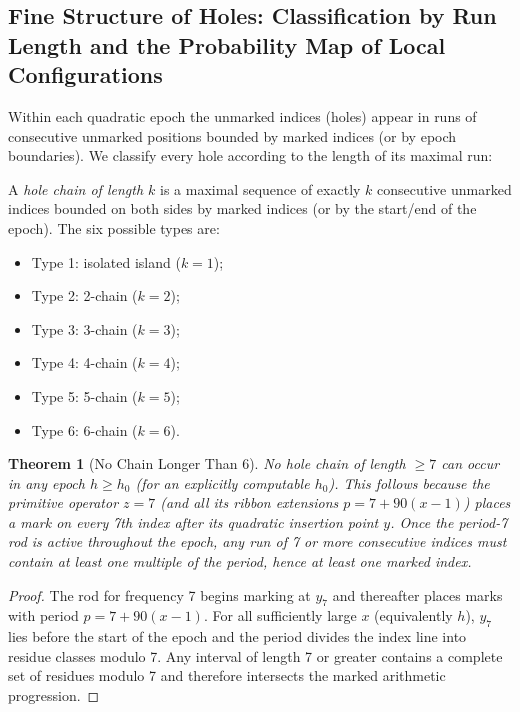 \documentclass[11pt,a4paper]{article}
\newtheorem{theorem}{Theorem} %
\begin{document}
\subsection{Fine Structure of Holes: Classification by Run Length and the Probability Map of Local Configurations}

Within each quadratic epoch the unmarked indices (holes) appear in runs of consecutive unmarked positions bounded by marked indices (or by epoch boundaries). We classify every hole according to the length of its maximal run:

\begin{definition}
A \emph{hole chain of length \(k\)} is a maximal sequence of exactly \(k\) consecutive unmarked indices bounded on both sides by marked indices (or by the start/end of the epoch). The six possible types are:
\begin{itemize}
\item Type 1: isolated island (\(k=1\));
\item Type 2: 2-chain (\(k=2\));
\item Type 3: 3-chain (\(k=3\));
\item Type 4: 4-chain (\(k=4\));
\item Type 5: 5-chain (\(k=5\));
\item Type 6: 6-chain (\(k=6\)).
\end{itemize}
\end{definition}

\begin{theorem}[No Chain Longer Than 6]
No hole chain of length \(\geq7\) can occur in any epoch \(h\geq h_0\) (for an explicitly computable \(h_0\)). This follows because the primitive operator \(z=7\) (and all its ribbon extensions \(p=7+90(x-1)\)) places a mark on every 7th index after its quadratic insertion point \(y\). Once the period-7 rod is active throughout the epoch, any run of 7 or more consecutive indices must contain at least one multiple of the period, hence at least one marked index.
\end{theorem}

\begin{proof}
The rod for frequency 7 begins marking at \(y_7\) and thereafter places marks with period \(p=7+90(x-1)\). For all sufficiently large \(x\) (equivalently \(h\)), \(y_7\) lies before the start of the epoch and the period divides the index line into residue classes modulo 7. Any interval of length 7 or greater contains a complete set of residues modulo 7 and therefore intersects the marked arithmetic progression.
\end{proof}
\end{document}
